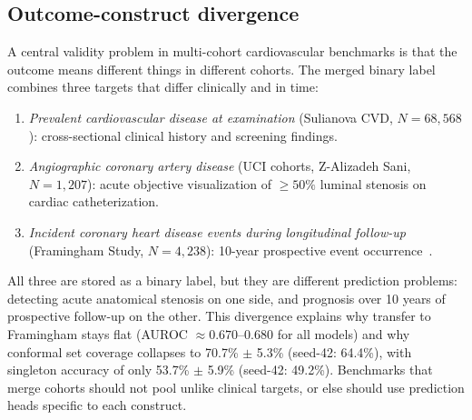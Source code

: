 \documentclass[conference]{IEEEtran}
\begin{document}
\subsection{Outcome-construct divergence}
A central validity problem in multi-cohort cardiovascular benchmarks is that the outcome means different things in different cohorts. The merged binary label combines three targets that differ clinically and in time:
\begin{enumerate}
\item \emph{Prevalent cardiovascular disease at examination} (Sulianova CVD, $N{=}68{,}568$): cross-sectional clinical history and screening findings.
\item \emph{Angiographic coronary artery disease} (UCI cohorts, Z-Alizadeh Sani, $N{=}1{,}207$): acute objective visualization of $\ge 50\%$ luminal stenosis on cardiac catheterization.
\item \emph{Incident coronary heart disease events during longitudinal follow-up} (Framingham Study, $N{=}4{,}238$): 10-year prospective event occurrence~\cite{dawber1951}.
\end{enumerate}
All three are stored as a binary label, but they are different prediction problems: detecting acute anatomical stenosis on one side, and prognosis over 10 years of prospective follow-up on the other. This divergence explains why transfer to Framingham stays flat (AUROC $\approx 0.670$--$0.680$ for all models) and why conformal set coverage collapses to 70.7\% $\pm$ 5.3\% (seed-42: 64.4\%), with singleton accuracy of only 53.7\% $\pm$ 5.9\% (seed-42: 49.2\%). Benchmarks that merge cohorts should not pool unlike clinical targets, or else should use prediction heads specific to each construct.
\end{document}
